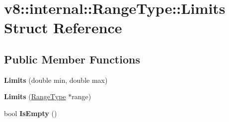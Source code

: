 \hypertarget{structv8_1_1internal_1_1_range_type_1_1_limits}{}\section{v8\+:\+:internal\+:\+:Range\+Type\+:\+:Limits Struct Reference}
\label{structv8_1_1internal_1_1_range_type_1_1_limits}
\subsection*{Public Member Functions}
\begin{DoxyCompactItemize}
\item 
{\bfseries Limits} (double min, double max)\hypertarget{structv8_1_1internal_1_1_range_type_1_1_limits_a837b128ca40222be4efc6ec37094309a}{}\label{structv8_1_1internal_1_1_range_type_1_1_limits_a837b128ca40222be4efc6ec37094309a}

\item 
{\bfseries Limits} (\hyperlink{classv8_1_1internal_1_1_range_type}{Range\+Type} $\ast$range)\hypertarget{structv8_1_1internal_1_1_range_type_1_1_limits_acb7b75ecbfefe1e1541bb6bc8ea07b6a}{}\label{structv8_1_1internal_1_1_range_type_1_1_limits_acb7b75ecbfefe1e1541bb6bc8ea07b6a}

\item 
bool {\bfseries Is\+Empty} ()\hypertarget{structv8_1_1internal_1_1_range_type_1_1_limits_ac6da1105af0ec4cd46d5a42b47677b8b}{}\label{structv8_1_1internal_1_1_range_type_1_1_limits_ac6da1105af0ec4cd46d5a42b47677b8b}

\end{DoxyCompactItemize}
